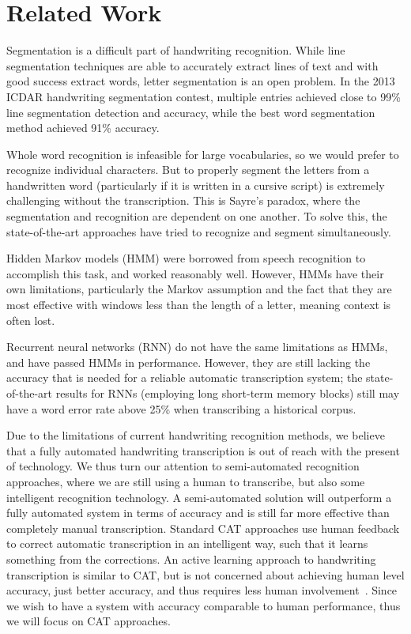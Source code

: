 \documentclass[ms]{byuprop}
\begin{document}
\section{Related Work}

Segmentation is a difficult part of handwriting recognition. While line segmentation techniques are able to accurately extract lines of text and with good success extract words, letter segmentation is an open problem. In the 2013 ICDAR handwriting segmentation contest, multiple entries achieved close to 99\% line segmentation detection and accuracy, while the best word segmentation method achieved 91\% accuracy\cite{icdar_segmentation2013}.

Whole word recognition is infeasible for large vocabularies, so we would prefer to recognize individual characters. But to properly segment the letters from a handwritten word (particularly if it is written in a cursive script) is extremely challenging without the transcription. This is Sayre's paradox, where the segmentation and recognition are dependent on one another.\cite{sayres} To solve this, the state-of-the-art approaches have tried to recognize and segment simultaneously.

Hidden Markov models (HMM) were borrowed from speech recognition to accomplish this task, and worked reasonably well\cite{Marti2001}. However, HMMs have their own limitations, particularly the Markov assumption and the fact that they are most effective with windows less than the length of a letter, meaning context is often lost.

Recurrent neural networks (RNN) do not have the same limitations as HMMs, and have passed HMMs in performance\cite{Graves2009hmm}. However, they are still lacking the accuracy that is needed for a reliable automatic transcription system; the state-of-the-art results for RNNs (employing long short-term memory blocks) still may have a word error rate above 25\% when transcribing a historical corpus\cite{icdarComp2015}.



Due to the limitations of current handwriting recognition methods, we believe that a fully automated handwriting transcription is out of reach with the present of technology. We thus turn our attention to semi-automated recognition approaches, where we are still using a human to transcribe, but also some intelligent recognition technology. A semi-automated solution will outperform a fully automated system in terms of accuracy and is still far more effective than completely manual transcription. Standard CAT approaches use human feedback to correct automatic transcription in an intelligent way, such that it learns something from the corrections. An active learning approach to handwriting transcription is similar to CAT, but is not concerned about achieving human level accuracy, just better accuracy, and thus requires less human involvement~\cite{Serrano2010}. Since we wish to have a system with accuracy comparable to human performance, thus we will focus on CAT approaches.
\end{document}
